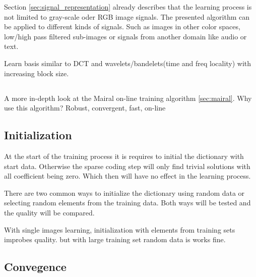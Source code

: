 Section \ref{sec:signal_representation} already describes that the learning
process is not limited to gray-scale oder RGB image signals. The presented
algorithm can be applied to different kinds of signals. Such as images in other
color spaces, low/high pass filtered sub-images or signals from another domain
like audio or text. 

Learn basis similar to DCT and wavelets/bandelets(time and freq locality) with
increasing block size.




\subsection{\trainDL}
A more in-depth look at the Mairal on-line training algorithm \ref{sec:mairal}. 
Why use this algorithm? Robust, convergent, fast, on-line

\subsection{Initialization}
At the start of the training process it is requires to initial the
dictionary with start data. Otherwise the sparse coding step will only find
trivial solutions with all coefficient being zero. Which then will have no
effect in the learning process.

There are two common ways to initialize the dictionary using random data or
selecting random elements from the training data. Both ways will be tested and 
the quality will be compared.


With single images learning, initialization with elements from training sets
improbes quality. but with large training set random data is works fine.



\subsection{Convegence}

